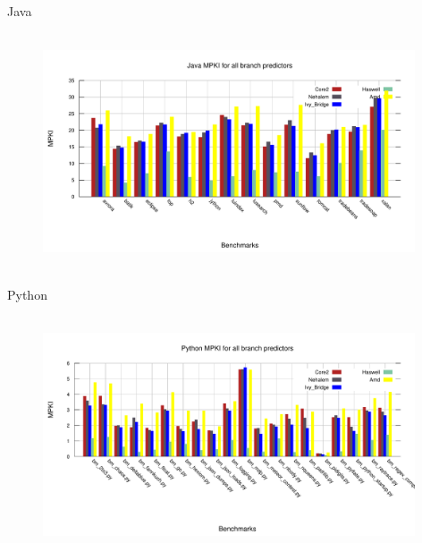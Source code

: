 \documentclass[10pt]{beamer}
\begin{document}
\begin{frame}{Java}
    \begin{figure}[t]
        \centering
        \includegraphics[width=11cm, height=7cm]{figures/java_MPKI.pdf}
    \end{figure}
\end{frame}

\begin{frame}{Python}
    \begin{figure}[t]
        \centering
        \includegraphics[width=11cm, height=7cm]{figures/python_MPKI.pdf}
    \end{figure}
\end{frame}
\end{document}
